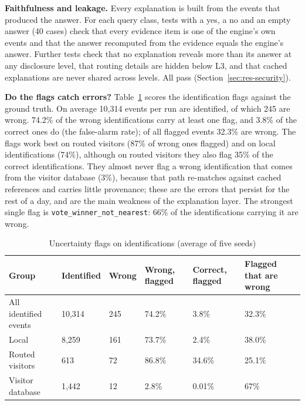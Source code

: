 \documentclass[12pt,a4paper,oneside]{report}
\begin{document}
\textbf{Faithfulness and leakage.} Every explanation is built from the events that produced the answer. For each query class, tests with a yes, a no and an empty answer (40 cases) check that every evidence item is one of the engine's own events and that the answer recomputed from the evidence equals the engine's answer. Further tests check that no explanation reveals more than its answer at any disclosure level, that routing details are hidden below L3, and that cached explanations are never shared across levels. All pass (Section~\ref{sec:res-security}).

\textbf{Do the flags catch errors?} Table~\ref{tab:expl-id} scores the identification flags against the ground truth. On average 10,314 events per run are identified, of which 245 are wrong. 74.2\% of the wrong identifications carry at least one flag, and 3.8\% of the correct ones do (the false-alarm rate); of all flagged events 32.3\% are wrong. The flags work best on routed visitors (87\% of wrong ones flagged) and on local identifications (74\%), although on routed visitors they also flag 35\% of the correct identifications. They almost never flag a wrong identification that comes from the visitor database (3\%), because that path re-matches against cached references and carries little provenance; these are the errors that persist for the rest of a day, and are the main weakness of the explanation layer. The strongest single flag is \texttt{vote\_\allowbreak winner\_\allowbreak not\_\allowbreak nearest}: 66\% of the identifications carrying it are wrong.

\begin{table}[htbp]
\centering
\caption{Uncertainty flags on identifications (average of five seeds)}\label{tab:expl-id}
{\small\setlength{\tabcolsep}{4pt}\renewcommand{\arraystretch}{1.2}
\begin{tabular}{|p{4.03cm}|p{1.65cm}|p{1.65cm}|p{2.20cm}|p{2.20cm}|p{1.65cm}|}\hline
\textbf{Group} & \textbf{Identified} & \textbf{Wrong} & \textbf{Wrong, flagged} & \textbf{Correct, flagged} & \textbf{Flagged that are wrong}\\\hline
All identified events & 10,314 & 245 & 74.2\% & 3.8\% & 32.3\%\\\hline
Local & 8,259 & 161 & 73.7\% & 2.4\% & 38.0\%\\\hline
Routed visitors & 613 & 72 & 86.8\% & 34.6\% & 25.1\%\\\hline
Visitor database & 1,442 & 12 & 2.8\% & 0.01\% & 67\%\\\hline
\end{tabular}}
\end{table}
\end{document}

